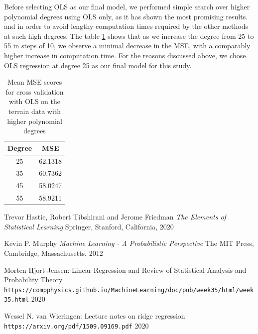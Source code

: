 \documentclass{article}
\begin{document}
Before selecting OLS as our final model, we performed simple search over higher polynomial degrees using OLS only, as it has shown the most promising results. and in order to avoid lengthy computation times required by the other methods at such high degrees. The table \ref{table:4} shows that as we increase the degree from 25 to 55 in steps of 10, we observe a minimal decrease in the MSE, with a comparably higher increase in computation time. For the reasons discussed above, we chose OLS regression at degree 25 as our final model for this study.
\begin{table}[h!]
\centering
\begin{tabular}{||c c||} 
 \hline
 Degree & MSE \\ 
 \hline
 25 & 62.1318  \\ 
 35 & 60.7362  \\
 45 & 58.0247  \\
 55 & 58.9211  \\  
 \hline
\end{tabular}
\caption{Mean MSE scores for cross validation with OLS on the terrain data with higher polynomial degrees}
\label{table:4}
\end{table}


\clearpage

\begin{thebibliography}{3}
Trevor Hastie, Robert Tibshirani and Jerome Friedman
\textit{The Elements of Statistical Learning}
Springer, Stanford, California, 2020

Kevin P. Murphy
\textit{Machine Learning - A Probabilistic Perspective}
The MIT Press, Cambridge, Massachusetts, 2012

Morten Hjort-Jensen: Linear Regression and Review of Statistical Analysis and Probability Theory 
\\\texttt{https://compphysics.github.io/MachineLearning/doc/pub/week35/html/week35.html}
2020

Wessel N. van Wieringen: Lecture notes on ridge regression
\\\texttt{https://arxiv.org/pdf/1509.09169.pdf}
2020

\end{thebibliography}
\end{document}
